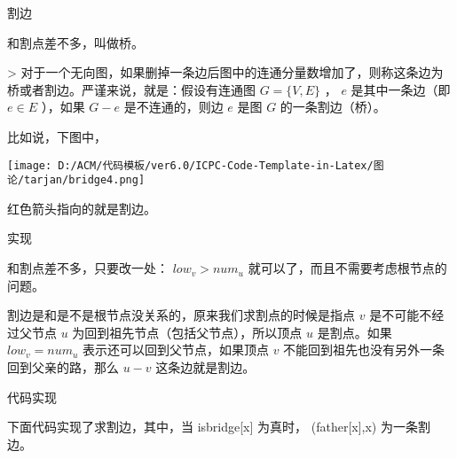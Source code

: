 割边

和割点差不多，叫做桥。

> 对于一个无向图，如果删掉一条边后图中的连通分量数增加了，则称这条边为桥或者割边。严谨来说，就是：假设有连通图 $G=\{V,E\}$ ， $e$ 是其中一条边（即 $e \in E$ ），如果 $G-e$ 是不连通的，则边 $e$ 是图 $G$ 的一条割边（桥）。

比如说，下图中，

\texttt{[image: D:/ACM/代码模板/ver6.0/ICPC-Code-Template-in-Latex/图论/tarjan/bridge4.png]}

红色箭头指向的就是割边。

实现

和割点差不多，只要改一处： $low_v>num_u$ 就可以了，而且不需要考虑根节点的问题。

割边是和是不是根节点没关系的，原来我们求割点的时候是指点 $v$ 是不可能不经过父节点 $u$ 为回到祖先节点（包括父节点），所以顶点 $u$ 是割点。如果 $low_v=num_u$ 表示还可以回到父节点，如果顶点 $v$ 不能回到祖先也没有另外一条回到父亲的路，那么 $u-v$ 这条边就是割边。

代码实现

下面代码实现了求割边，其中，当 isbridge[x] 为真时， (father[x],x) 为一条割边。
